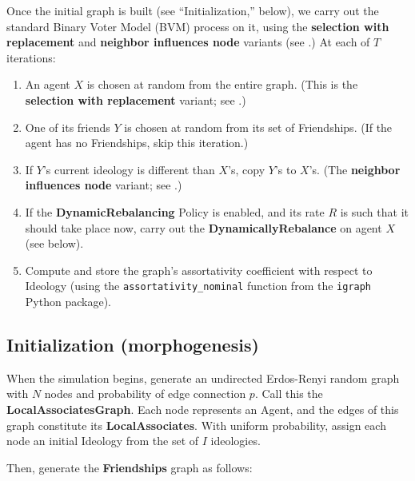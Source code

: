 Once the initial graph is built (see ``Initialization,'' below), we carry out
the standard Binary Voter Model (BVM) process on it, using the
\textbf{selection with replacement} and \textbf{neighbor influences node}
variants (see \cite{davies_computational_2016}.) At each of $T$ iterations:

\begin{enumerate}
\itemsep.1em
\item An agent $X$ is chosen at random from the entire graph.
(This is the \textbf{selection with replacement} variant; see \cite{davies_computational_2016}.)
\item One of its friends $Y$ is chosen at random from its set of Friendships.
(If the agent has no Friendships, skip this iteration.)
\item If $Y$'s current ideology is different than $X$'s, copy $Y$'s to $X$'s.
(The \textbf{neighbor influences node} variant; see \cite{davies_computational_2016}.)
\item If the \textbf{DynamicRebalancing} Policy is enabled, and its rate $R$
is such that it should take place now, carry out the
\textbf{DynamicallyRebalance} on agent $X$ (see below).
 
\item Compute and store the graph's assortativity coefficient with respect to
Ideology (using the \texttt{assortativity\_nominal} function from the
\texttt{igraph} Python package\cite{csardi_igraph_2006}). \end{enumerate}


\subsection{Initialization (morphogenesis)}
\label{sec:initialization}

When the simulation begins, generate an undirected Erdos-Renyi random
graph\cite{erdos_evolution_1960} with $N$ nodes and probability of edge
connection $p$. Call this the \textbf{LocalAssociatesGraph}. Each node
represents an Agent, and the edges of this graph constitute its
\textbf{LocalAssociates}. With uniform probability, assign each node an
initial Ideology from the set of $I$ ideologies.

Then, generate the \textbf{Friendships} graph as follows:

